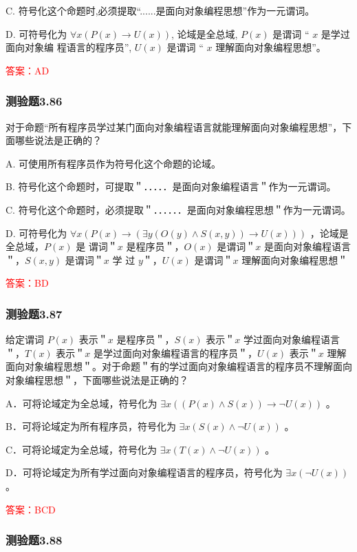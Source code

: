 \documentclass[UTF8, heading=true]{ctexart}
\begin{document}
C. 符号化这个命题时,必须提取“......是面向对象编程思想”作为一元谓词。

D. 可符号化为 $\forall x(P(x) \rightarrow U(x))$, 论域是全总域, $P(x)$ 是谓词 “ $x$ 是学过面向对象编
程语言的程序员”, $U(x)$ 是谓词 “ $x$ 理解面向对象编程思想”。

\textcolor{red}{答案：AD}

\subsubsection{测验题3.86}

对于命题“所有程序员学过某门面向对象编程语言就能理解面向对象编程思想”，下面哪些说法是正确的？

A. 
可使用所有程序员作为符号化这个命题的论域。

B. 
符号化这个命题时，可提取＂．．．．．是面向对象编程语言＂作为一元谓词。

C. 
符号化这个命题时，必须提取＂．．．．．．是面向对象编程思想＂作为一元谓词。

D. 
可符号化为 $\forall x(P(x) \rightarrow(\exists y(O(y) \wedge S(x, y)) \rightarrow U(x)))$ ，论域是全总域，$P(x)$ 是
谓词＂$x$ 是程序员＂，$O(x)$ 是谓词＂$x$ 是面向对象编程语言＂，$S(x, y)$ 是谓词＂$x$ 学
过 $y$＂，$U(x)$ 是谓词＂$x$ 理解面向对象编程思想＂

\textcolor{red}{答案：BD}

\subsubsection{测验题3.87}

给定谓词 $P(x)$ 表示＂$x$ 是程序员＂，$S(x)$ 表示＂$x$ 学过面向对象编程语言＂，$T(x)$ 表示＂$x$ 是学过面向对象编程语言的程序员＂，$U(x)$ 表示＂$x$ 理解面向对象编程思想＂。对于命题＂有的学过面向对象编程语言的程序员不理解面向对象编程思想＂，下面哪些说法是正确的？

A．可将论域定为全总域，符号化为 $\exists x((P(x) \wedge S(x)) \rightarrow \neg U(x))$ 。

B．可将论域定为所有程序员，符号化为 $\exists x(S(x) \wedge \neg U(x))$ 。

C．可将论域定为全总域，符号化为 $\exists x(T(x) \wedge \neg U(x))$ 。

D．可将论域定为所有学过面向对象编程语言的程序员，符号化为 $\exists x(\neg U(x))$ 。


\textcolor{red}{答案：BCD}

\subsubsection{测验题3.88}
\end{document}
